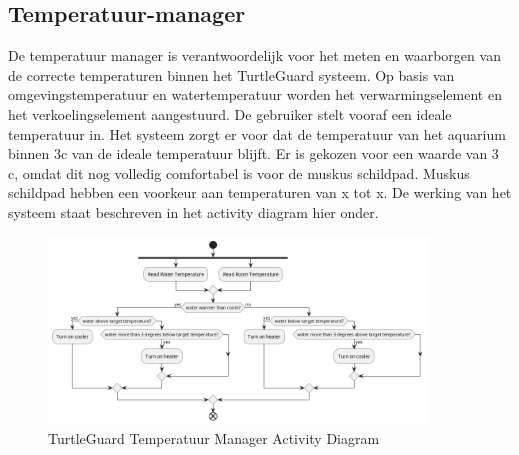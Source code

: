\documentclass[a4paper]{report}
\newcommand{\turtleguard}{\mbox{TurtleGuard\texttrademark}\xspace}
\begin{document}
\subsection{Temperatuur-manager}
\label{sec:tempmgr}
De temperatuur manager is verantwoordelijk voor het meten en waarborgen van de correcte temperaturen binnen het \turtleguard systeem.
Op basis van omgevingstemperatuur en watertemperatuur worden het verwarmingselement en het verkoelingselement aangestuurd.
De gebruiker stelt vooraf een ideale temperatuur in. Het systeem zorgt er voor dat de temperatuur van het aquarium binnen 3\textdegree c van de ideale temperatuur blijft.
Er is gekozen voor een waarde van 3 \textdegree c, omdat dit nog volledig comfortabel is voor de muskus schildpad. Muskus schildpad hebben een voorkeur aan temperaturen van x tot x.
De werking van het systeem staat beschreven in het activity diagram hier onder.

\begin{figure}[H]
  \centering
  \includegraphics[width=0.9\textwidth]{Images/ActivityDiagramTemp.png}
  \caption{\turtleguard Temperatuur Manager Activity Diagram}
  \label{fig:activitydiagramtemperature}
\end{figure}
\end{document}
